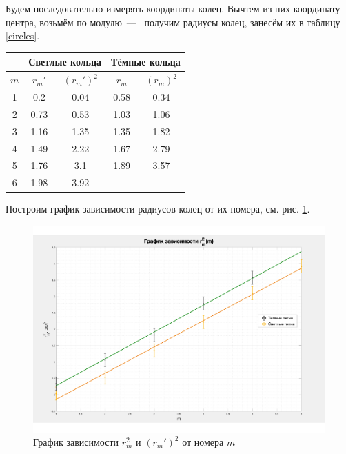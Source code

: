 \documentclass[a4paper,12pt]{article}
\begin{document}
Будем последовательно измерять координаты колец. Вычтем из них координату центра, возьмём по модулю~---~ получим радиусы колец, занесём их в таблицу \ref{circles}. 

\begin{center}
	\begin{tabular}{|c|c|c|c|c|}
			\hline
			& \multicolumn{2}{|c|}{Светлые кольца} & \multicolumn{2}{|c|}{Тёмные кольца} \\
			\hline
			$m$ & $ r_m' $ & $ (r_m')^2 $ & $ r_m $ & $ (r_m)^2 $ \\
			\hline
			
			1 & 0.2 & 0.04 & 0.58 & 0.34  \\
			2 & 0.73 & 0.53 & 1.03 & 1.06  \\
			3 & 1.16 & 1.35 & 1.35 & 1.82  \\
			4 & 1.49 & 2.22 & 1.67 & 2.79 \\
			5 & 1.76 & 3.1 & 1.89  & 3.57  \\
			6 & 1.98 & 3.92 &  &  \\
			
			\hline
		\end{tabular}
	\label{circles}
\end{center}

Построим график зависимости радиусов колец от их номера, см. рис. \ref{graf}.

\begin{center}
	\begin{figure}[hbt!]
		\centering
		\includegraphics[width=\linewidth]{gr1.pdf}
		\caption{График зависимости $r_m^2$ и $(r_m')^2$ от номера $m$}
		\label{graf}
	\end{figure}
\end{center}
 
\end{document}
